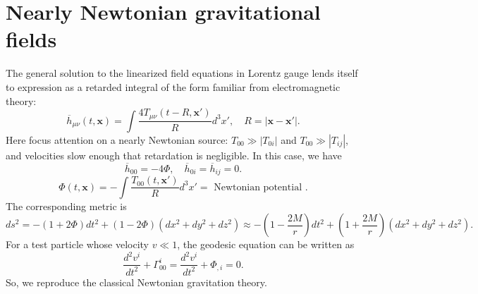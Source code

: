 \section{Nearly Newtonian gravitational fields}
The general solution to the linearized field equations in Lorentz gauge lends itself to expression as a retarded integral of the form familiar from electromagnetic theory:
\[\overline{h}_{\mu\nu}(t,\bm{x}) = \int \frac{4T_{\mu\nu}(t-R,\bm{x}')}{R} d^3x' , \quad R = |\bm{x}-\bm{x}'|.\]
Here focus attention on a nearly Newtonian source: $T_{00} \gg |T_{0i}|$ and $T_{00} \gg |T_{ij}|$, and velocities
slow enough that retardation is negligible. In this case, we have
\[\overline{h}_{00} = -4\Phi , \quad \overline{h}_{0i} = \overline{h}_{ij} = 0.\]
\[\Phi(t,\bm{x}) = -\int \frac{T_{00}(t,\bm{x}')}{R} d^3x' = \mbox{ Newtonian potential }.\]
The corresponding metric is
\[ds^2 = -(1+2\Phi)dt^2 + (1-2\Phi)(dx^2 + dy^2 + dz^2) \approx -(1-\frac{2M}{r})dt^2 + (1+\frac{2M}{r})(dx^2 + dy^2 + dz^2).\]
For a test particle whose velocity $v \ll 1$, the geodesic equation can be written as
\[\frac{d^2 v^i}{dt^2} + \Gamma^{i}_{00} = \frac{d^2 v^i}{dt^2} + \Phi_{,i} = 0.\]
So, we reproduce the classical Newtonian gravitation theory.

